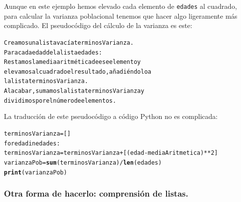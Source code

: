\documentclass[10pt,a4paper]{article}\usepackage[]{graphicx}\usepackage[]{color}
\makeatletter
\newcommand{\hlkwd}[1]{\textcolor[rgb]{0.737,0.353,0.396}{\textbf{#1}}}%
\newenvironment{kframe}{%
 \def\at@end@of@kframe{}%
 \ifinner\ifhmode%
  \def\at@end@of@kframe{\end{minipage}}%
  \begin{minipage}{\columnwidth}%
 \fi\fi%
 \def\FrameCommand##1{\hskip\@totalleftmargin \hskip-\fboxsep
 \colorbox{shadecolor}{##1}\hskip-\fboxsep
     \hskip-\linewidth \hskip-\@totalleftmargin \hskip\columnwidth}%
 \MakeFramed {\advance\hsize-\width
   \@totalleftmargin\z@ \linewidth\hsize
   \@setminipage}}%
 {\par\unskip\endMakeFramed%
 \at@end@of@kframe}
\newenvironment{knitrout}{}{} %
\makeatother
\begin{document}
Aunque en este ejemplo hemos elevado cada elemento de {\tt edades} al cuadrado, para calcular la varianza poblacional tenemos que hacer algo ligeramente más complicado. El pseudocódigo del cálculo de la varianza es este:

\begin{knitrout}
\color{fgcolor}\begin{kframe}
\begin{alltt}
Creamos una lista vacía terminosVarianza.
Para cada edad de la lista edades:
    Restamos la media aritmética de ese elemento y
    elevamos al cuadrado el resultado, añadiéndolo a
    la lista terminosVarianza.
Al acabar, sumamos la lista terminosVarianza y
dividimos por el número de elementos.
\end{alltt}
\end{kframe}
\end{knitrout}

La traducción de este pseudocódigo a código Python no es complicada:
\begin{knitrout}
\color{fgcolor}\begin{kframe}
\begin{alltt}
terminosVarianza = []
for edad in edades:
  terminosVarianza = terminosVarianza + [(edad - mediaAritmetica)**2]
varianzaPob = \hlkwd{sum}(terminosVarianza) / \hlkwd{len}(edades)
\hlkwd{print}(varianzaPob)
\end{alltt}
\end{kframe}
\end{knitrout}

\subsubsection*{Otra forma de hacerlo: comprensión de listas.}
\label{tut02:subsubsec:comprensionListas}
\end{document}
